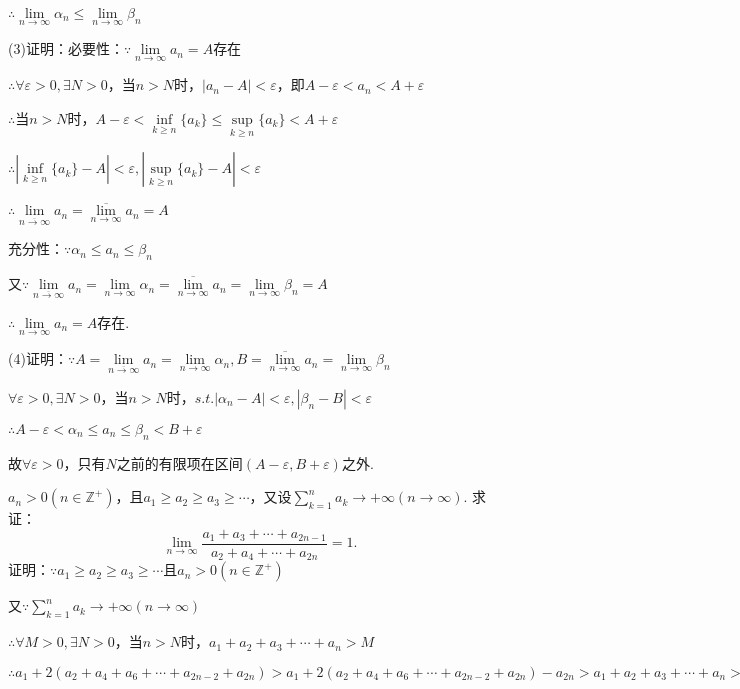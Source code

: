 \documentclass[12pt,UTF8]{ctexart}
\begin{document}
\begin{enumerate}
$\therefore\lim\limits_{n\rightarrow\infty}\alpha_n\leq\lim\limits_{n\rightarrow\infty}\beta_n$

(3)证明：必要性：$\because\lim\limits_{n\rightarrow\infty}a_n=A$存在

$\therefore\forall\varepsilon>0,\exists N>0$，当$n>N$时，$|a_n-A|<\varepsilon$，即$A-\varepsilon<a_n<A+\varepsilon$

$\therefore$当$n>N$时，$A-\varepsilon<\inf\limits_{k\geq n}\{a_k\}\leq\sup\limits_{k\geq n}\{a_k\}<A+\varepsilon$

$\therefore|\inf\limits_{k\geq n}\{a_k\}-A|<\varepsilon,|\sup\limits_{k\geq n}\{a_k\}-A|<\varepsilon$

$\therefore\lim\limits_{\overline{n\rightarrow\infty}}a_n=\overline{\lim\limits_{n\rightarrow\infty}}a_n=A$

充分性：$\because\alpha_n\leq a_n\leq\beta_n$

又$\because\lim\limits_{\overline{n\rightarrow\infty}}a_n=\lim\limits_{n\rightarrow\infty}\alpha_n=\overline{\lim\limits_{n\rightarrow\infty}}a_n=\lim\limits_{n\rightarrow\infty}\beta_n=A$

$\therefore\lim\limits_{n\rightarrow\infty}a_n=A$存在.

(4)证明：$\because A=\lim\limits_{\overline{n\rightarrow\infty}}a_n=\lim\limits_{n\rightarrow\infty}\alpha_n,B=\overline{\lim\limits_{n\rightarrow\infty}}a_n=\lim\limits_{n\rightarrow\infty}\beta_n$

$\forall\varepsilon>0,\exists N>0$，当$n>N$时，$s.t. |\alpha_n-A|<\varepsilon,|\beta_n-B|<\varepsilon$

$\therefore A-\varepsilon<\alpha_n\leq a_n\leq\beta_n<B+\varepsilon$

故$\forall\varepsilon>0$，只有$N$之前的有限项在区间$(A-\varepsilon,B+\varepsilon)$之外.

$a_n>0(n\in\mathbb Z^+)$，且$a_1\geq a_2\geq a_3\geq\cdots$，又设$\sum_{k=1}^na_k\rightarrow+\infty(n\rightarrow\infty)$. 求证：
\[
\lim\limits_{n\rightarrow\infty}\frac{a_1+a_3+\cdots+a_{2n-1}}{a_2+a_4+\cdots+a_{2n}}=1.
\]
证明：$\because a_1\geq a_2\geq a_3\geq\cdots$且$a_n>0(n\in\mathbb Z^+)$

又$\because\sum_{k=1}^na_k\rightarrow+\infty(n\rightarrow\infty)$

$\therefore\forall M>0,\exists N>0$，当$n>N$时，$a_1+a_2+a_3+\cdots+a_n>M$

$\therefore a_1+2(a_2+a_4+a_6+\cdots+a_{2n-2}+a_{2n})>a_1+2(a_2+a_4+a_6+\cdots+a_{2n-2}+a_{2n})-a_{2n}>a_1+a_2+a_3+\cdots+a_n>M$


\end{enumerate}
\end{document}
